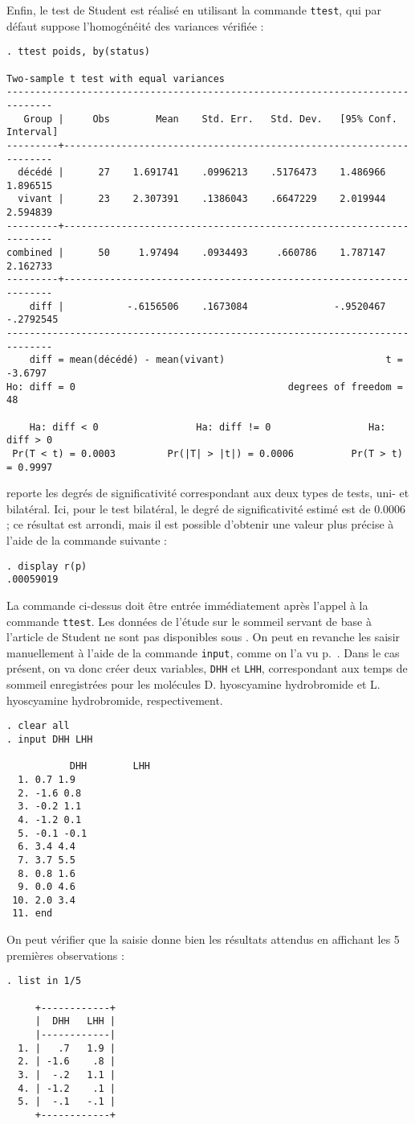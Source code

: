 Enfin, le test de Student est réalisé en utilisant la commande
\texttt{ttest}, qui par défaut suppose l'homogénéité des variances vérifiée :
\begin{verbatim}
. ttest poids, by(status)

Two-sample t test with equal variances
------------------------------------------------------------------------------
   Group |     Obs        Mean    Std. Err.   Std. Dev.   [95% Conf. Interval]
---------+--------------------------------------------------------------------
  décédé |      27    1.691741    .0996213    .5176473    1.486966    1.896515
  vivant |      23    2.307391    .1386043    .6647229    2.019944    2.594839
---------+--------------------------------------------------------------------
combined |      50     1.97494    .0934493     .660786    1.787147    2.162733
---------+--------------------------------------------------------------------
    diff |           -.6156506    .1673084               -.9520467   -.2792545
------------------------------------------------------------------------------
    diff = mean(décédé) - mean(vivant)                            t =  -3.6797
Ho: diff = 0                                     degrees of freedom =       48

    Ha: diff < 0                 Ha: diff != 0                 Ha: diff > 0
 Pr(T < t) = 0.0003         Pr(|T| > |t|) = 0.0006          Pr(T > t) = 0.9997
\end{verbatim}
\Stata reporte les degrés de significativité correspondant aux deux types de
tests, uni- et bilatéral. Ici, pour le test bilatéral, le degré de
significativité estimé est de 0.0006 ; ce résultat est arrondi, mais il est
possible d'obtenir une valeur plus précise à l'aide de la commande suivante :
\begin{verbatim}
. display r(p)
.00059019
\end{verbatim}
La commande ci-dessus doit être entrée immédiatement après l'appel à la
commande \verb|ttest|.
%
%
%
\soln{\ref{exo:9.2}} Les données de l'étude sur le sommeil servant de base à
l'article de Student ne sont pas disponibles sous \Stata. On peut en revanche
les saisir manuellement à l'aide de la commande \verb|input|, comme on l'a
vu p.~\pageref{para:edit}. Dans le cas présent, on va donc créer deux
variables, \texttt{DHH} et \texttt{LHH}, correspondant aux temps de sommeil
enregistrées pour les molécules D. hyoscyamine hydrobromide et
L. hyoscyamine hydrobromide, respectivement. 
\begin{verbatim}
. clear all
. input DHH LHH

           DHH        LHH
  1. 0.7 1.9
  2. -1.6 0.8
  3. -0.2 1.1
  4. -1.2 0.1
  5. -0.1 -0.1
  6. 3.4 4.4
  7. 3.7 5.5
  8. 0.8 1.6
  9. 0.0 4.6
 10. 2.0 3.4
 11. end
\end{verbatim}
On peut vérifier que la saisie donne bien les résultats attendus en
affichant les 5 premières observations :
\begin{verbatim}
. list in 1/5

     +------------+
     |  DHH   LHH |
     |------------|
  1. |   .7   1.9 |
  2. | -1.6    .8 |
  3. |  -.2   1.1 |
  4. | -1.2    .1 |
  5. |  -.1   -.1 |
     +------------+
\end{verbatim}


